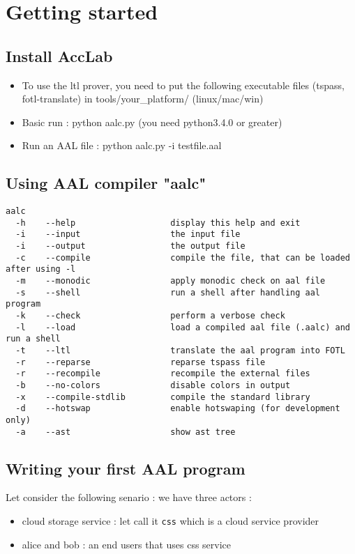 \section{Getting started}

\subsection{Install AccLab}
\begin{itemize}
  \item To use the ltl prover, you need to put the following executable files (tspass, fotl-translate) in tools/your\_platform/ (linux/mac/win)
  \item Basic run : python aalc.py (you need python3.4.0 or greater)
  \item Run an AAL file : python aalc.py -i testfile.aal
\end{itemize}


\subsection{Using AAL compiler "aalc"}
{
\lstset{style=shell}
\begin{lstlisting}[caption={aalc options}]
aalc 
  -h    --help                   display this help and exit
  -i    --input                  the input file
  -i    --output                 the output file
  -c    --compile                compile the file, that can be loaded after using -l
  -m    --monodic                apply monodic check on aal file
  -s    --shell                  run a shell after handling aal program
  -k    --check                  perform a verbose check
  -l    --load                   load a compiled aal file (.aalc) and run a shell
  -t    --ltl                    translate the aal program into FOTL
  -r    --reparse                reparse tspass file
  -r    --recompile              recompile the external files
  -b    --no-colors              disable colors in output
  -x    --compile-stdlib         compile the standard library
  -d    --hotswap                enable hotswaping (for development only)
  -a    --ast                    show ast tree
\end{lstlisting}
}

\subsection{Writing your first AAL program}
Let consider the following senario :
we have three actors :
\begin{itemize}
    \item cloud storage service : let call it \texttt{css} which is a cloud service provider
    \item alice and bob : an end users that uses css service
\end{itemize}

